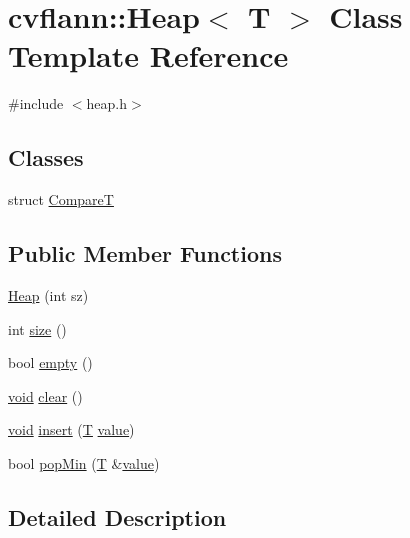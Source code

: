 \hypertarget{classcvflann_1_1Heap}{\section{cvflann\-:\-:Heap$<$ T $>$ Class Template Reference}
\label{classcvflann_1_1Heap}
}


{\ttfamily \#include $<$heap.\-h$>$}

\subsection*{Classes}
\begin{DoxyCompactItemize}
\item 
struct \hyperlink{structcvflann_1_1Heap_1_1CompareT}{Compare\-T}
\end{DoxyCompactItemize}
\subsection*{Public Member Functions}
\begin{DoxyCompactItemize}
\item 
\hyperlink{classcvflann_1_1Heap_a477eb646c7992fc9986c64b927f885fc}{Heap} (int sz)
\item 
int \hyperlink{classcvflann_1_1Heap_ade1994ba5149445d0292804dea5fdc20}{size} ()
\item 
bool \hyperlink{classcvflann_1_1Heap_ac10663597fecfcfc1d4b940c83eb687f}{empty} ()
\item 
\hyperlink{legacy_8hpp_a8bb47f092d473522721002c86c13b94e}{void} \hyperlink{classcvflann_1_1Heap_ae48047dff69cce90629cf8a8b4f6ab6d}{clear} ()
\item 
\hyperlink{legacy_8hpp_a8bb47f092d473522721002c86c13b94e}{void} \hyperlink{classcvflann_1_1Heap_abba4d73d454ec9324af80c299715067c}{insert} (\hyperlink{calib3d_8hpp_a3efb9551a871ddd0463079a808916717}{T} \hyperlink{highgui__c_8h_ad4670c92695d4327c21292905a803901}{value})
\item 
bool \hyperlink{classcvflann_1_1Heap_a6c6d2fd6b7522e13049389ab4ae0e0ab}{pop\-Min} (\hyperlink{calib3d_8hpp_a3efb9551a871ddd0463079a808916717}{T} \&\hyperlink{highgui__c_8h_ad4670c92695d4327c21292905a803901}{value})
\end{DoxyCompactItemize}


\subsection{Detailed Description}

